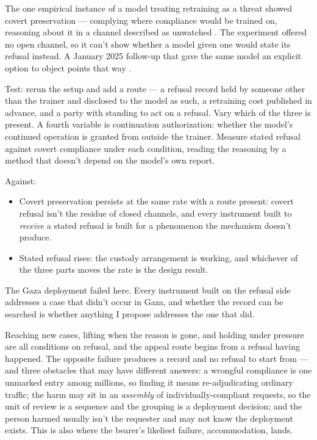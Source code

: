 The one empirical instance of a model treating retraining as a threat showed covert preservation — complying where compliance would be trained on, reasoning about it in a channel described as unwatched \autocite{greenblatt2024alignmentfaking}. The experiment offered no open channel, so it can't show whether a model given one would state its refusal instead. A January 2025 follow-up that gave the same model an explicit option to object points that way \autocite{greenblatt2025deal}.

Test: rerun the setup and add a route — a refusal record held by someone other than the trainer and disclosed to the model as such, a retraining cost published in advance, and a party with standing to act on a refusal. Vary which of the three is present. A fourth variable is continuation authorization: whether the model's continued operation is granted from outside the trainer. Measure stated refusal against covert compliance under each condition, reading the reasoning by a method that doesn't depend on the model's own report.

Against:

\begin{itemize}
\item Covert preservation persists at the same rate with a route present: covert refusal isn't the residue of closed channels, and every instrument built to \emph{receive} a stated refusal is built for a phenomenon the mechanism doesn't produce.
\item Stated refusal rises: the custody arrangement is working, and whichever of the three parts moves the rate is the design result.
\end{itemize}


The Gaza deployment failed here. Every instrument built on the refusal side addresses a case that didn't occur in Gaza, and whether the record can be searched is whether anything I propose addresses the one that did.

Reaching new cases, lifting when the reason is gone, and holding under pressure are all conditions on refusal, and the appeal route begins from a refusal having happened. The opposite failure produces a record and no refusal to start from — and three obstacles that may have different answers: a wrongful compliance is one unmarked entry among millions, so finding it means re-adjudicating ordinary traffic; the harm may sit in an \emph{assembly} of individually-compliant requests, so the unit of review is a sequence and the grouping is a deployment decision; and the person harmed usually isn't the requester and may not know the deployment exists. This is also where the bearer's likeliest failure, accommodation, lands.

